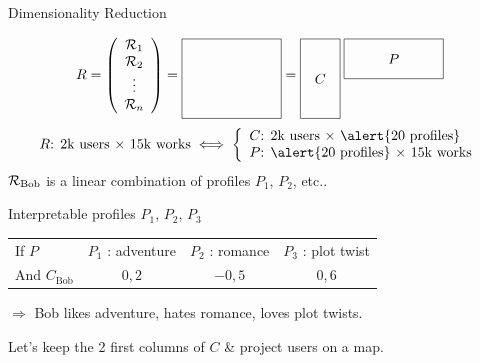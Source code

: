 \documentclass[]{beamer}
\begin{document}
\begin{frame}{Dimensionality Reduction}

\vspace{-5mm}

\[ R = \left(\begin{array}{c}
\R_1\\
\R_2\\
\vdots\\
\R_n
\end{array}\right) = \raisebox{-1cm}{\begin{tikzpicture}
\draw (0,0) rectangle (2.5,2);
\end{tikzpicture}} =
\raisebox{-1cm}{\begin{tikzpicture}
\draw (0,0) rectangle ++(1,2);
\draw node at (0.5,1) {$C$};
\draw (1.1,1) rectangle ++(2.5,1);
\draw node at (2.35,1.5) {$P$};
\end{tikzpicture}} \]
\[ \text{$R$: 2k users $\times$ 15k works} \iff
\left\{\begin{array}{l}
\text{$C$: 2k users $\times$ \alert{20 profiles}}\\
\text{$P$: \alert{20 profiles} $\times$ 15k works}\\
\end{array}\right. \]
\(\mathcal{R}_\text{Bob}\) is a linear combination of profiles \(P_1\), \(P_2\), etc..

\vspace{5mm}

\pause

\begin{block}{Interpretable profiles \(P_1\), \(P_2\), \(P_3\)}

\begin{tabular}{@{}lccc@{}}
If $P$ & $P_1$ : adventure & $P_2$ : romance & $P_3$ : plot twist\\
And $C_\text{Bob}$ & $0,2$ & $-0,5$ & $0,6$
\end{tabular}

\hfill \(\Rightarrow\) Bob \alert{likes} adventure, \alert{hates} romance, \alert{loves} plot twists.

\end{block}

\pause

Let's keep the 2 first columns of $C$ \& project users on a map.

\end{frame}
\end{document}
